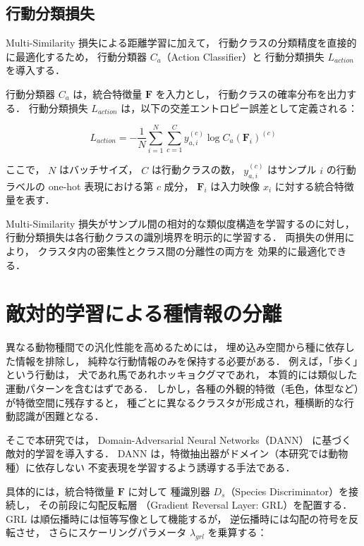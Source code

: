\subsection{行動分類損失}
Multi-Similarity 損失による距離学習に加えて，
行動クラスの分類精度を直接的に最適化するため，
行動分類器 $C_a$（Action Classifier）と
行動分類損失 $L_{action}$ を導入する．

行動分類器 $C_a$ は，統合特徴量 $\mathbf{F}$ を入力とし，
行動クラスの確率分布を出力する．
行動分類損失 $L_{action}$ は，以下の交差エントロピー誤差として定義される：

\begin{equation}
  L_{action}
  = -\frac{1}{N}
  \sum_{i=1}^{N}
  \sum_{c=1}^{C}
  y_{a,i}^{(c)}
  \log C_a(\mathbf{F}_i)^{(c)}
  \label{eq:action_loss}
\end{equation}

ここで，
$N$ はバッチサイズ，
$C$ は行動クラスの数，
$y_{a,i}^{(c)}$ はサンプル $i$ の行動ラベルの one-hot 表現における第 $c$ 成分，
$\mathbf{F}_i$ は入力映像 $x_i$ に対する統合特徴量を表す．

Multi-Similarity 損失がサンプル間の相対的な類似度構造を学習するのに対し，
行動分類損失は各行動クラスの識別境界を明示的に学習する．
両損失の併用により，
クラスタ内の密集性とクラス間の分離性の両方を
効果的に最適化できる．


\section{敵対的学習による種情報の分離}

異なる動物種間での汎化性能を高めるためには，
埋め込み空間から種に依存した情報を排除し，
純粋な行動情報のみを保持する必要がある．
例えば，「歩く」という行動は，
犬であれ馬であれホッキョクグマであれ，
本質的には類似した運動パターンを含むはずである．
しかし，各種の外観的特徴（毛色，体型など）が特徴空間に残存すると，
種ごとに異なるクラスタが形成され，種横断的な行動認識が困難となる．

そこで本研究では，
Domain-Adversarial Neural Networks（DANN）\cite{ganin2016domain} に基づく
敵対的学習を導入する．
DANN は，特徴抽出器がドメイン（本研究では動物種）に依存しない
不変表現を学習するよう誘導する手法である．

具体的には，統合特徴量 $\mathbf{F}$ に対して
種識別器 $D_s$（Species Discriminator）を接続し，
その前段に勾配反転層
（Gradient Reversal Layer: GRL）を配置する．
GRL は順伝播時には恒等写像として機能するが，
逆伝播時には勾配の符号を反転させ，
さらにスケーリングパラメータ $\lambda_{grl}$ を乗算する：

